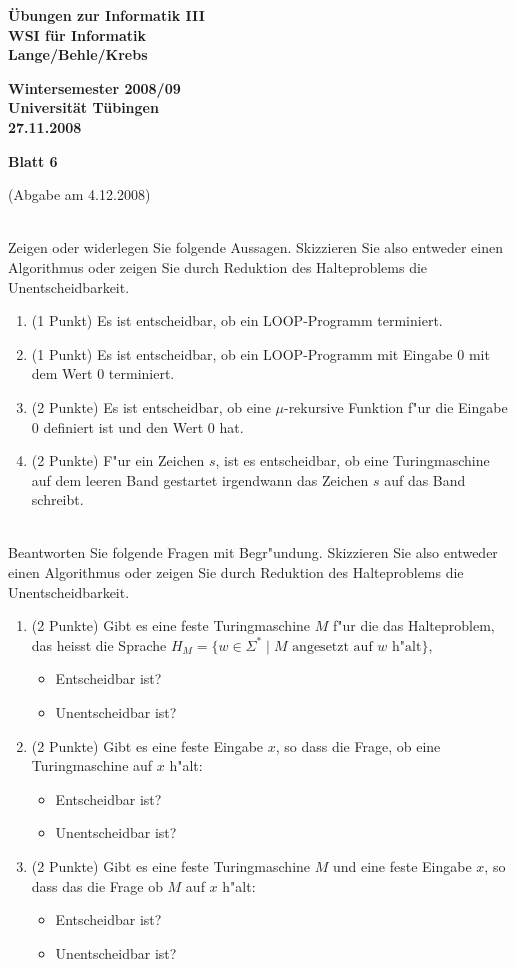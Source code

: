 \documentclass[a4paper]{article}
\def\header#1#2#3{\pagestyle{empty}
\noindent
\begin{minipage}[t]{0.6\textwidth}
\begin{flushleft}
\bf \"Ubungen zur Informatik III\\
WSI f\"ur Informatik\\
Lange/Behle/Krebs
\end{flushleft}
\end{minipage}
\begin{minipage}[t]{0.4\textwidth}
\begin{flushright}
\bf Wintersemester 2008/09\\
Universit\"at T\"ubingen\\
#2 %
\end{flushright}
\end{minipage}

\begin{center}
{\Large\bf Blatt #1}

{(Abgabe am #3)}
\end{center}
}
\begin{document}
\header{6}{27.11.2008}{4.12.2008}

\bigskip

\smallskip\\
Zeigen oder widerlegen Sie folgende Aussagen. Skizzieren Sie also entweder einen Algorithmus oder zeigen Sie durch Reduktion des Halteproblems die Unentscheidbarkeit.
\begin{enumerate}
\item(1 Punkt) Es ist entscheidbar, ob ein LOOP-Programm terminiert.
\item(1 Punkt) Es ist entscheidbar, ob ein LOOP-Programm mit Eingabe 0 mit dem Wert 0 terminiert.
\item(2 Punkte) Es ist entscheidbar, ob eine $\mu$-rekursive Funktion f"ur die Eingabe $0$ definiert ist und den Wert $0$ hat.
\item(2 Punkte) F"ur ein Zeichen $s$, ist es entscheidbar, ob eine Turingmaschine auf dem leeren Band gestartet irgendwann das Zeichen $s$ auf das Band schreibt.
\end{enumerate}

\bigskip
{}\smallskip\\
Beantworten Sie folgende Fragen mit Begr"undung. Skizzieren Sie also entweder einen Algorithmus oder zeigen Sie durch Reduktion des Halteproblems die Unentscheidbarkeit.
\begin{enumerate}
\item(2 Punkte) Gibt es eine feste Turingmaschine $M$ f"ur die das Halteproblem, das heisst die Sprache $H_M=\{w\in\Sigma^*\mid M\mbox{ angesetzt auf $w$ h"alt}\}$,
\begin{itemize}
\item Entscheidbar ist?
\item Unentscheidbar ist?
\end{itemize}
\item(2 Punkte) Gibt es eine feste Eingabe $x$, so dass die Frage, ob eine Turingmaschine auf $x$ h"alt:
\begin{itemize}
\item Entscheidbar ist?
\item Unentscheidbar ist?
\end{itemize}
\item(2 Punkte) Gibt es eine feste Turingmaschine $M$ und eine feste Eingabe $x$, so dass das die Frage ob $M$ auf $x$ h"alt:
\begin{itemize}
\item Entscheidbar ist?
\item Unentscheidbar ist?
\end{itemize}
\end{enumerate}
\end{document}
